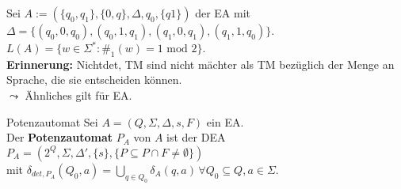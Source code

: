\begin{exam}
    Sei $A := (\{q_0,q_1\},\{0,q\},\Delta,q_0,\{q1\})$ der EA mit \\
    $\Delta = \{(q_0,0,q_0),(q_0,1,q_1),(q_1,0,q_1),(q_1,1,q_0)\}$. \\


    $L(A) = \{w \in \Sigma^* : \#_1(w) = 1 \text{ mod } 2\}$. \\

    \textbf{Erinnerung:} Nichtdet, TM sind nicht mächter als TM bezüglich der Menge an Sprache, die sie entscheiden können.\\


    $\leadsto$ Ähnliches gilt für EA.
\end{exam}

\begin{defn}{Potenzautomat}
        Sei $A = (Q,\Sigma,\Delta,s,F)$ ein EA. \\

        Der \textbf{Potenzautomat} $P_A$ von $A$ ist der DEA \\
        $P_A = (2^Q, \Sigma, \Delta', \{s\},\{P \subseteq P \cap F \neq \emptyset\})$ \\
        mit $\delta_{det,P_A}(Q_0,a) = \bigcup\limits_{q \in Q_0} \delta_A(q,a) \, \forall Q_0 \subseteq Q, a \in \Sigma$.
\end{defn}

